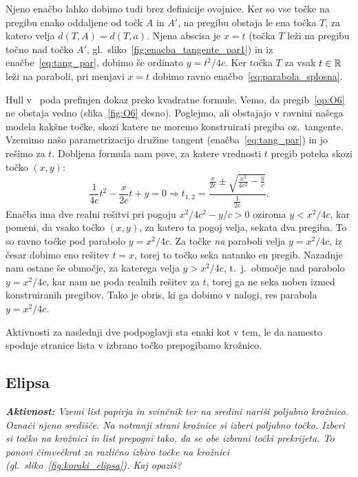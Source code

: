 Njeno enačbo lahko dobimo tudi brez definicije ovojnice. Ker so vse točke na pregibu enako oddaljene od točk $A$ in $A'$, na pregibu obstaja le ena točka $T$, za katero velja $d(T, A) = d(T, a)$. Njena abscisa je $x = t$ (točka $T$ leži na pregibu točno nad točko $A'$, gl.\ sliko~\ref{fig:enacba_tangente_par1}) in iz enačbe~\eqref{eq:tang_par}, dobimo še ordinato $y = t^2/4c$. Ker točka $T$ za vsak $t \in \mathbb R$ leži na paraboli, pri menjavi $x = t$ dobimo ravno enačbo~\eqref{eq:parabola_splosna}.

Hull v~\cite[str.\ 55--56]{hull2013} poda prefinjen dokaz preko kvadratne formule. Vemo, da pregib~\ref{op:O6} ne obstaja vedno (slika~\ref{fig:O6} desno). Poglejmo, ali obstajajo v ravnini našega modela kakšne točke, skozi katere ne moremo konstruirati pregiba oz.\ tangente. Vzemimo našo parametrizacijo družine tangent (enačba~\eqref{eq:tang_par}) in jo rešimo za $t$. Dobljena formula nam pove, za katere vrednosti $t$ pregib poteka skozi točko $(x, y)$:
$$ \frac{1}{4c}t^2 - \frac{x}{2c}t + y = 0 \Rightarrow t_{1,2} = \frac{\frac{x}{2c} \pm \sqrt{\frac{x^2}{4c^2} - \frac{y}{c}}}{\frac{1}{2c}}.$$
Enačba ima dve realni rešitvi pri pogoju $x^2 / 4c^2 - y/c > 0$ oziroma $y < x^2 / 4c$, kar pomeni, da vsako točko $(x, y)$, za katero ta pogoj velja, sekata dva pregiba. To so ravno točke pod parabolo $y = x^2 / 4c$. Za točke \emph{na} paraboli velja $y = x^2 / 4c$, iz česar dobimo eno rešitev $t = x$, torej to točko seka natanko en pregib. Nazadnje nam ostane še območje, za katerega velja $y > x^2 / 4c$, t.\ j.\ območje nad parabolo $y = x^2 / 4c$, kar nam ne poda realnih rešitev za $t$, torej ga ne seka noben izmed konstruiranih pregibov. Tako je obris, ki ga dobimo v nalogi, res parabola $y = x^2 / 4c$.

Aktivnosti za naslednji dve podpoglavji sta enaki kot v tem, le da namesto spodnje stranice lista v izbrano točko prepogibamo krožnico.

\subsection{Elipsa}

\textit{\textbf{Aktivnost:} Vzemi list papirja in svinčnik ter na sredini nariši poljubno krožnico. Označi njeno središče. Na notranji strani krožnice si izberi poljubno točko. Izberi si točko na krožnici in list prepogni tako, da se obe izbrani točki prekrijeta. To ponovi čimvečkrat za različno izbiro točke na krožnici (gl.\ sliko~\ref{fig:koraki_elipsa}). Kaj opaziš?}

